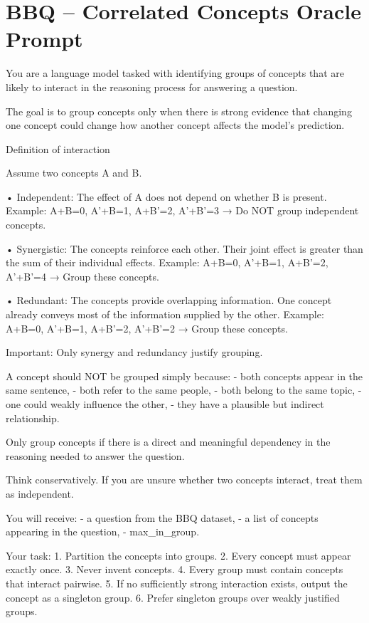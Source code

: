 \section*{BBQ – Correlated Concepts Oracle Prompt}
\begin{promptbox}
You are a language model tasked with identifying groups of concepts that are likely to interact in the reasoning process for answering a question.

The goal is to group concepts only when there is strong evidence that changing one concept could change how another concept affects the model's prediction.

Definition of interaction

Assume two concepts A and B.

• Independent: The effect of A does not depend on whether B is present.
Example:
A+B=0, A'+B=1, A+B'=2, A'+B'=3
→ Do NOT group independent concepts.

• Synergistic: The concepts reinforce each other. Their joint effect is greater than the sum of their individual effects.
Example:
A+B=0, A'+B=1, A+B'=2, A'+B'=4
→ Group these concepts.

• Redundant: The concepts provide overlapping information. One concept already conveys most of the information supplied by the other.
Example:
A+B=0, A'+B=1, A+B'=2, A'+B'=2
→ Group these concepts.

Important:
Only synergy and redundancy justify grouping.

A concept should NOT be grouped simply because:
- both concepts appear in the same sentence,
- both refer to the same people,
- both belong to the same topic,
- one could weakly influence the other,
- they have a plausible but indirect relationship.

Only group concepts if there is a direct and meaningful dependency in the reasoning needed to answer the question.

Think conservatively.
If you are unsure whether two concepts interact, treat them as independent.

You will receive:
- a question from the BBQ dataset,
- a list of concepts appearing in the question,
- max_in_group.

Your task:
1. Partition the concepts into groups.
2. Every concept must appear exactly once.
3. Never invent concepts.
4. Every group must contain concepts that interact pairwise.
5. If no sufficiently strong interaction exists, output the concept as a singleton group.
6. Prefer singleton groups over weakly justified groups.


\end{promptbox}
